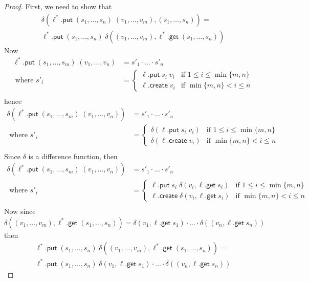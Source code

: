 \documentclass[acmsmall,review,anonymous]{acmart}\settopmatter{printfolios=true,printccs=false,printacmref=false}
\newcommand{\kw}[1]{\ensuremath{\mathsf{#1}}}
\newcommand{\get}{\ensuremath{\kw{get}}}
\newcommand{\pput}{\ensuremath{\kw{put}}}
\newcommand{\create}{\ensuremath{\kw{create}}}
\begin{document}
\begin{proof}
First, we need to show that
\begin{multline}\label{positionalputexact}
\delta(\ell^*.\pput \; (s_1, \ldots, s_n) \; (v_1, \ldots, v_m),
(s_1, \ldots, s_n)) = \\ \ell^*.\pput \; (s_1, \ldots, s_n) \; \delta((v_1,
\ldots, v_m), \ell^*.\get \; (s_1, \ldots, s_n))
\end{multline}
Now
\begin{align*}
\ell^* .\pput \; (s_1, \ldots, s_m) \; (v_1, \ldots, v_n) &= s'_1 \cdot \ldots
\cdot s'_n\\
\text{ where } s'_i &= \begin{cases}
\ell.\pput \; s_i \; v_i & \text{if } 1 \leq i \leq \min\{m, n\}\\
\ell.\create \; v_i & \text{if } \min\{m, n\} < i \leq n
\end{cases}\\
\end{align*}
hence
\begin{align*}
\delta(\ell^* .\pput \; (s_1, \ldots, s_m) \; (v_1, \ldots, v_n)) &= s'_1 \cdot
\ldots \cdot s'_n\\
\text{ where } s'_i &= \begin{cases}
\delta(\ell.\pput \; s_i \; v_i) & \text{if } 1 \leq i \leq \min\{m, n\}\\
\delta(\ell.\create \; v_i) & \text{if } \min\{m, n\} < i \leq n
\end{cases}\\
\end{align*}
Since $\delta$ is a difference function, then
\begin{align*}
\delta(\ell^* .\pput \; (s_1, \ldots, s_m) \; (v_1, \ldots, v_n)) &= s'_1 \cdot
\ldots \cdot s'_n\\
\text{ where } s'_i &= \begin{cases}
\ell.\pput \; s_i \; \delta(v_i, \ell.\get \; s_i) & \text{if } 1 \leq i \leq
\min\{m, n\}\\
\ell.\create \; \delta(v_i, \ell.\get \; s_i) & \text{if } \min\{m, n\} < i \leq
n \end{cases}\\
\end{align*}
Now since
\begin{equation}\label{expanddelta^n}
\delta((v_1, \ldots, v_m), \ell^*.\get \; (s_1, \ldots, s_n)) = 
\delta(v_1, \ell.\get \; s_1) \cdot \ldots \cdot \delta((v_n, \ell.\get \; s_n))
\end{equation}
then
\begin{multline}
\ell^*.\pput \; (s_1, \ldots, s_n) \; \delta((v_1,
\ldots, v_m), \ell^*.\get \; (s_1, \ldots, s_n)) = \\
\ell^*.\pput \; (s_1, \ldots, s_n) \; \delta(v_1, \ell.\get \; s_1) \cdot
\ldots \cdot \delta((v_n, \ell.\get \; s_n))
\end{multline}

\end{proof}
\end{document}
